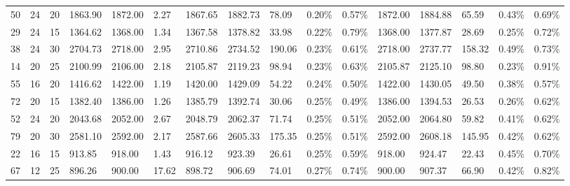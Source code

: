 \documentclass[../main]{subfiles}
\begin{document}
\begin{longtable}{l|ll|lll|lllll|lllll}
   50 & 24                         & 20                         & 1863.90                   & 1872.00     & 2.27                & 1867.65 & 1882.73 & 78.09  & 0.20\%  & 0.57\% & 1872.00 & 1884.88 & 65.59  & 0.43\%  & 0.69\% \\
   29 & 24                         & 15                         & 1364.62                   & 1368.00     & 1.34                & 1367.58 & 1378.82 & 33.98  & 0.22\%  & 0.79\% & 1368.00 & 1377.87 & 28.69  & 0.25\%  & 0.72\% \\
   38 & 24                         & 30                         & 2704.73                   & 2718.00     & 2.95                & 2710.86 & 2734.52 & 190.06 & 0.23\%  & 0.61\% & 2718.00 & 2737.77 & 158.32 & 0.49\%  & 0.73\% \\
   14 & 20                         & 25                         & 2100.99                   & 2106.00     & 2.18                & 2105.87 & 2119.23 & 98.94  & 0.23\%  & 0.63\% & 2105.87 & 2125.10 & 98.80  & 0.23\%  & 0.91\% \\
   55 & 16                         & 20                         & 1416.62                   & 1422.00     & 1.19                & 1420.00 & 1429.09 & 54.22  & 0.24\%  & 0.50\% & 1422.00 & 1430.05 & 49.50  & 0.38\%  & 0.57\% \\
   72 & 20                         & 15                         & 1382.40                   & 1386.00     & 1.26                & 1385.79 & 1392.74 & 30.06  & 0.25\%  & 0.49\% & 1386.00 & 1394.53 & 26.53  & 0.26\%  & 0.62\% \\
   52 & 24                         & 20                         & 2043.68                   & 2052.00     & 2.67                & 2048.79 & 2062.37 & 71.74  & 0.25\%  & 0.51\% & 2052.00 & 2064.80 & 59.82  & 0.41\%  & 0.62\% \\
   79 & 20                         & 30                         & 2581.10                   & 2592.00     & 2.17                & 2587.66 & 2605.33 & 175.35 & 0.25\%  & 0.51\% & 2592.00 & 2608.18 & 145.95 & 0.42\%  & 0.62\% \\
   22 & 16                         & 15                         & 913.85                    & 918.00      & 1.43                & 916.12  & 923.39  & 26.61  & 0.25\%  & 0.59\% & 918.00  & 924.47  & 22.43  & 0.45\%  & 0.70\% \\
   67 & 12                         & 25                         & 896.26                    & 900.00      & 17.62               & 898.72  & 906.69  & 74.01  & 0.27\%  & 0.74\% & 900.00  & 907.37  & 66.90  & 0.42\%  & 0.82\% \\

\end{longtable}
\end{document}
